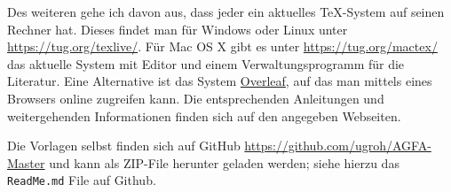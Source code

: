 Des weiteren gehe ich davon aus, dass jeder ein aktuelles \TeX{}-System auf seinen Rechner hat. 
Dieses findet man für Windows oder Linux unter \href{https://tug.org/texlive/}{https://tug.org/texlive/}.
Für Mac OS X gibt es unter \href{https://tug.org/mactex/}{https://tug.org/mactex/} das aktuelle System mit Editor und einem Verwaltungsprogramm für die Literatur.
Eine Alternative ist das System \href{https://www.overleaf.com}{Overleaf}, auf das man mittels eines Browsers online zugreifen kann.
Die entsprechenden Anleitungen und weitergehenden Informationen finden sich auf den angegeben Webseiten.

Die Vorlagen selbst finden sich auf GitHub 
\href{https://github.com/ugroh/AGFA-Master}{https://github.com/ugroh/AGFA-Master} und kann als ZIP-File herunter geladen werden; siehe hierzu das \texttt{ReadMe.md} File auf Github. 







